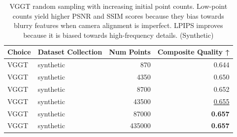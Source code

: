 \begin{table}[H]
\caption{\ifdefined\customcaption \customcaption \else VGGT random sampling with increasing initial point counts. Low-point counts yield higher PSNR and SSIM scores because they bias towards blurry features when camera alignment is imperfect. LPIPS improves because it is biased towards high-frequency details. (Synthetic) \fi}
\label{tab:03_sampling_mode_single_synthetic}
\centering
\scriptsize
\begin{tabular}{llrr}
\toprule
Choice & Dataset Collection & Num Points & Composite Quality ↑ \\
\midrule
VGGT & synthetic & 870 & 0.644 \\
VGGT & synthetic & 4350 & 0.650 \\
VGGT & synthetic & 8700 & 0.652 \\
VGGT & synthetic & 43500 & \underline{0.655} \\
VGGT & synthetic & 87000 & \textbf{0.657} \\
VGGT & synthetic & 435000 & \textbf{0.657} \\
\bottomrule
\end{tabular}
\end{table}